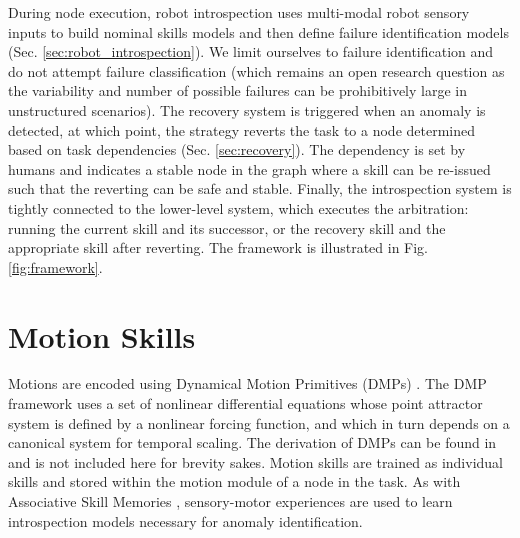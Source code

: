 \documentclass[letterpaper, 10 pt, conference]{ieeeconf}  %
\begin{document}
During node execution, robot introspection uses multi-modal robot sensory inputs to build nominal skills models and then define failure identification models (Sec. \ref{sec:robot_introspection}). We limit ourselves to failure identification and do not attempt failure classification (which remains an open research question as the variability and number of possible failures can be prohibitively large in unstructured scenarios). The recovery system is triggered when an anomaly is detected, at which point, the strategy reverts the task to a node determined based on task dependencies (Sec. \ref{sec:recovery}). The dependency is set by humans and indicates a stable node in the graph where a skill can be re-issued such that the reverting can be safe and stable. Finally, the introspection system is tightly connected to the lower-level system, which executes the arbitration: running the current skill and its successor, or the recovery skill and the appropriate skill after reverting. The framework is illustrated in Fig. \ref{fig:framework}.
\section{Motion Skills}\label{sec:motor_skills}
Motions are encoded using Dynamical Motion Primitives (DMPs) \cite{2009ICRA-Pastor-LfD_DMP}. The DMP framework uses a set of nonlinear differential equations whose point attractor system is defined by a nonlinear forcing function, and which in turn depends on a canonical system for temporal scaling. The derivation of DMPs can be found in \cite{2009ICRA-Pastor-LfD_DMP} and is not included here for brevity sakes. Motion skills are trained as individual skills and stored within the motion module of a node in the task. As with Associative Skill Memories \cite{2015RSS-Kappler-DateDrivenOnlineDecisionMakingManipu}, sensory-motor experiences are used to learn introspection models \cite{Rojas_n_Peters:2005:ABBI,2015RSS-Kappler-DateDrivenOnlineDecisionMakingManipu} necessary for anomaly identification.
\end{document}
